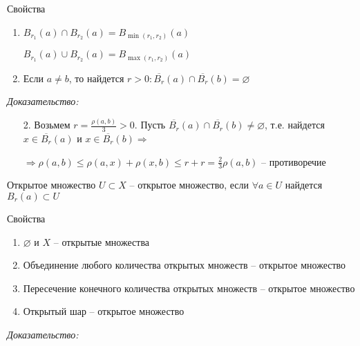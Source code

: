 \documentclass[12pt]{article}
\begin{document}
\begin{theo}{Свойства}
    \begin{enumerate}
        \item $B_{r_1}(a) \cap B_{r_2}(a) = B_{\min(r_1, r_2)}(a)$
        
        $B_{r_1}(a) \cup B_{r_2}(a) = B_{\max(r_1, r_2)}(a)$

        \item Если $a \neq b$, то найдется $r > 0 : \overline{B_r}(a) \cap \overline{B_r}(b) = \varnothing$
    \end{enumerate}
\end{theo}

\textit{Доказательство:}

\begin{enumerate}
    \item[2.] Возьмем $r = \frac{\rho(a, b)}{3} > 0$. Пусть $\overline{B_r}(a) \cap \overline{B_r}(b) \neq \varnothing$, т.е. найдется $x \in \overline{B_r}(a)$ и $x \in \overline{B_r}(b) \Rightarrow$
    
    $\Rightarrow \rho(a, b) \leq \rho(a, x) + \rho(x, b) \leq r + r = \frac{2}{3}\rho(a, b)$ -- противоречие
\end{enumerate}

\begin{defin}{Открытое множество}
    $U \subset X$ -- открытое множество, если $\forall a \in U$ найдется $B_r(a) \subset U$
\end{defin}

\begin{theo}{Свойства}
    \begin{enumerate}
        \item $\varnothing$ и $X$ -- открытые множества
        \item Объединение любого количества открытых множеств -- открытое множество
        \item Пересечение конечного количества открытых множеств -- открытое множество
        \item Открытый шар -- открытое множество
    \end{enumerate}
\end{theo}

\textit{Доказательство:}
\end{document}

